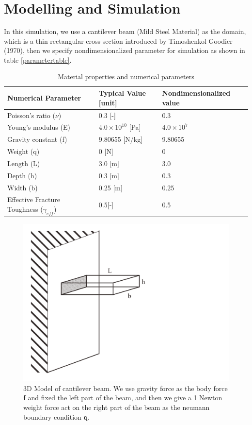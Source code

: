 \documentclass[a4paper,11pt]{article}
\begin{document}
\section{Modelling and Simulation}
In this simulation, we use a cantilever beam (Mild Steel Material) as the domain, which is a thin rectangular cross section introduced by Timoshenkol Goodier (1970), then we specify nondimensionalized parameter for simulation as shown in table \ref{parametertable}.
\begin{table}[h!]
	\centering
	\begin{tabular}{|l|l|l|}
		\hline
		Numerical Parameter & Typical Value [unit] & Nondimensionalized value\\
		\hline
		Poisson's ratio ($\nu$) & 0.3 [-] & 0.3\\
		Young's modulus (E) & $4.0 \times 10^{10}$ [Pa] & $4.0 \times 10^7$\\
		Gravity constant (f) & 9.80655 [N/kg] & 9.80655\\
		Weight (q) & 0 [N] & 0\\
		Length (L) & 3.0 [m] & 3.0\\
		Depth (h) & 0.3 [m] & 0.3\\
		Width (b) & 0.25 [m] & 0.25\\
		Effective Fracture Toughness ($\gamma_{eff}$) & 0.5[-] & 0.5\\
		\hline
	\end{tabular}
\caption{Material properties and numerical parameters}
\label{tab:parametertable}
\end{table}
\newline
\begin{figure}[h!]
	\centering
	\includegraphics[width=0.5\linewidth]{picture/3dmodellinearelasticity}
	\caption{3D Model of cantilever beam. We use gravity force as the body force \textbf{f} and fixed the left part of the beam, and then we give a 1 Newton weight force act on the right part of the beam as the neumann boundary condition \textbf{q}.}
	\label{fig:3dmodel}
\end{figure}
\end{document}
